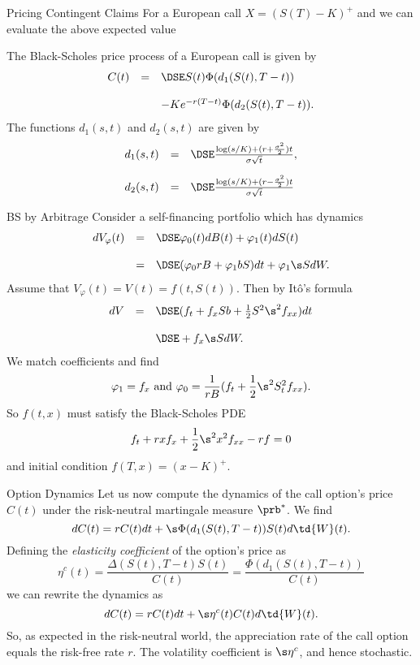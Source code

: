Pricing Contingent Claims
	For a European call $X = (S(T)-K)^+$ and  we can evaluate the above expected value

	The Black-Scholes price pro\-cess of a European call is given by
		$$
		\begin{array}{lll}
		C(t) &=&\DSE S(t) \Phi(d_1(S(t), T-t))\\*[12pt]
		&&- K e^{-r(T-t)} \Phi(d_2(S(t), T-t)).
		\end{array}
		$$
	The functions $d_1(s,t)$ and $d_2(s,t)$ are given by
		$$
		\begin{array}{lll}
		d_1(s,t) &=&\DSE \frac{\log(s/K) + (r +
		\frac{\sigma^2}{2})t}{\sigma \sqrt{t}},\\*[12pt] d_2(s,t) &=&\DSE
		 \frac{\log(s/K) + (r -
		\frac{\sigma^2}{2})t}{\sigma \sqrt{t}}
		\end{array}
		$$


BS by Arbitrage
	Consider a self-financing portfolio which has dynamics
		$$
		\begin{array}{lll}
		dV_\varphi(t)&=&\DSE \varphi_0(t)dB(t)+\varphi_1(t)dS(t)\\*[12pt]
		&=&\DSE (\varphi_0 r B+\varphi_1b S)dt + \varphi_1\s SdW.
		\end{array}
		$$
	Assume that
		$
		V_\varphi(t)=V(t)=f(t,S(t)).
		$
		Then by It{\^o}'s formula
		$$
		\begin{array}{lll}
		dV &=& \DSE (f_t+f_xSb+\frac{1}{2}S^2\s^2f_{xx})dt\\*[12pt] &&\DSE
		+ f_x\s SdW.
		\end{array}
		$$
	We match coefficients and find
		$$
		\varphi_1=f_x \mbox{ and }
		\varphi_0=\frac{1}{rB}(f_t+\frac{1}{2}\s^2S_t^2f_{xx}).
		$$
	So $f(t,x)$ must satisfy the Black-Scholes  PDE
		$$
		f_t+rxf_x+\frac{1}{2}\s^2x^2f_{xx}-rf=0
		$$
	and initial condition $f(T,x)=(x-K)^+$. 


Option Dynamics
	Let us now compute the dynamics of the call option's price $C(t)$
	under the risk-neutral martingale measure $\prb^*$. We find
		$$
		dC(t) = r C(t) dt + \s \Phi(d_1(S(t),T-t)) S(t) d \td{W}(t).
		$$
	Defining the {\it elasticity coefficient} of the option's price as
		$$
		\eta^c(t) = \frac{\Delta(S(t),T-t) S(t)}{C(t)} =
		\frac{\Phi(d_1(S(t),T-t))}{C(t)}
		$$
	we can rewrite the dynamics as
		$$
		dC(t) = r C(t) dt + \s \eta^c(t) C(t) d \td{W}(t).
		$$
	So, as expected in the risk-neutral world, the appreciation rate
	of the call option equals the risk-free rate $r$. The volatility
	coefficient is $\s \eta^c$, and hence stochastic.



